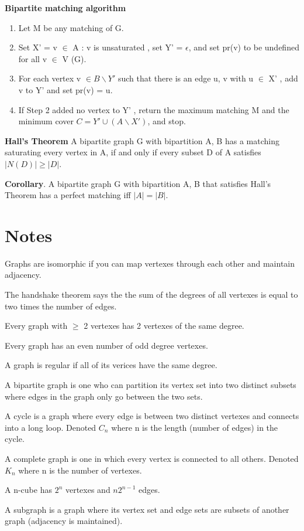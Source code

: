 \documentclass[12pt]{article}
\begin{document}
\textbf{Bipartite matching algorithm}
\begin{enumerate}
    \item Let M be any matching of G.
    \item Set X' = {v $\in$ A : v is unsaturated }, set Y' = $\epsilon$, and set pr(v) to be undefined for all v $\in$ V (G).
    \item For each vertex v $\in B \backslash Y'$ such that there is an edge {u, v} with u $\in$ X' , add v to Y' and set pr(v) = u.
    \item If Step 2 added no vertex to Y' , return the maximum matching M and the minimum cover $C = Y' \cup (A \backslash X' )$, and stop.
\end{enumerate}

\textbf{Hall's Theorem}
A bipartite graph G with bipartition A, B has a matching saturating every vertex in A, if and only if every subset D of A satisfies $|N (D)| \geq |D|$.

\textbf{Corollary}. A bipartite graph G with bipartition A, B that satisfies Hall's Theorem has a perfect matching iff $|A| = |B |$.

\section*{Notes}
Graphs are isomorphic if you can map vertexes through each other and maintain adjacency.

The handshake theorem says the the sum of the degrees of all vertexes is equal to two times the number of edges.

Every graph with $\geq$ 2 vertexes has 2 vertexes of the same degree.

Every graph has an even number of odd degree vertexes.

A graph is regular if all of its verices have the same degree.

A bipartite graph is one who can partition its vertex set into two distinct subsets where edges in the graph only go between the two sets.

A cycle is a graph where every edge is between two distinct vertexes and connects into a long loop. Denoted $C_n$ where n is the length (number of edges) in the cycle.

A complete graph is one in which every vertex is connected to all others. Denoted $K_n$ where n is the number of vertexes.

A n-cube has $2^n$ vertexes and $n2^{n-1}$ edges.

A subgraph is a graph where its vertex set and edge sets are subsets of another graph (adjacency is maintained).
\end{document}
